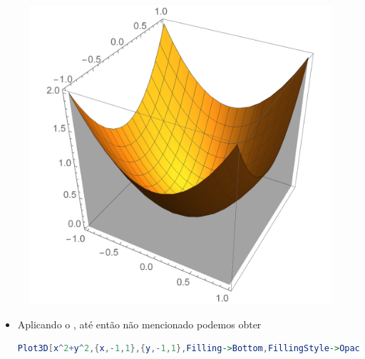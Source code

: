 \documentclass[a4paper, 12pt]{article}
\begin{document}
\begin{itemize}
\begin{itemize}
			\begin{figure}[!h]
				\centering
				\includegraphics[scale=.45]{images/Filling}
			\end{figure}
			
			\begin{itemize}
				\item Aplicando o , até então não mencionado podemos obter
				
\begin{lstlisting}[language=Mathematica]
Plot3D[x^2+y^2,{x,-1,1},{y,-1,1},Filling->Bottom,FillingStyle->Opacity[.8],PlotStyle->Red]
\end{lstlisting}


\end{itemize}
\end{itemize}
\end{itemize}
\end{document}
